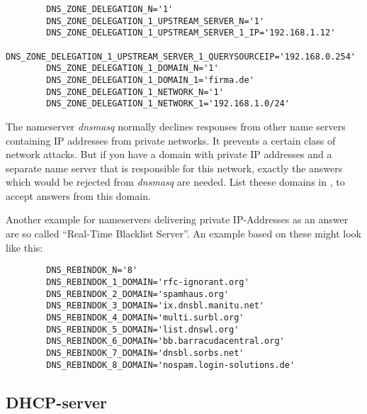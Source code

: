 \begin{description}
\begin{example}
\begin{verbatim}
        DNS_ZONE_DELEGATION_N='1'
        DNS_ZONE_DELEGATION_1_UPSTREAM_SERVER_N='1'
        DNS_ZONE_DELEGATION_1_UPSTREAM_SERVER_1_IP='192.168.1.12'
        DNS_ZONE_DELEGATION_1_UPSTREAM_SERVER_1_QUERYSOURCEIP='192.168.0.254'
        DNS_ZONE_DELEGATION_1_DOMAIN_N='1'
        DNS_ZONE_DELEGATION_1_DOMAIN_1='firma.de'
        DNS_ZONE_DELEGATION_1_NETWORK_N='1'
        DNS_ZONE_DELEGATION_1_NETWORK_1='192.168.1.0/24'
\end{verbatim}
\end{example}


    The nameserver \emph{dnsmasq} normally declines responses from other name servers
    containing IP addresses from private networks. It prevents a certain class of network
    attacks. But if you have a domain with private IP addresses and a separate
    name server that is responsible for this network, exactly the answers which
    would be rejected from \emph{dnsmasq} are needed. List theese domains in ,
    to accept answers from this domain.

    Another example for nameservers delivering private IP-Addresses as an answer are
    so called ``Real-Time Blacklist Server''. An example based on these might look like this:
\begin{example}
\begin{verbatim}
        DNS_REBINDOK_N='8'
        DNS_REBINDOK_1_DOMAIN='rfc-ignorant.org'
        DNS_REBINDOK_2_DOMAIN='spamhaus.org'
        DNS_REBINDOK_3_DOMAIN='ix.dnsbl.manitu.net'
        DNS_REBINDOK_4_DOMAIN='multi.surbl.org'
        DNS_REBINDOK_5_DOMAIN='list.dnswl.org'
        DNS_REBINDOK_6_DOMAIN='bb.barracudacentral.org'
        DNS_REBINDOK_7_DOMAIN='dnsbl.sorbs.net'
        DNS_REBINDOK_8_DOMAIN='nospam.login-solutions.de'
\end{verbatim}
\end{example}

\end{description}



\subsection{DHCP-server}

